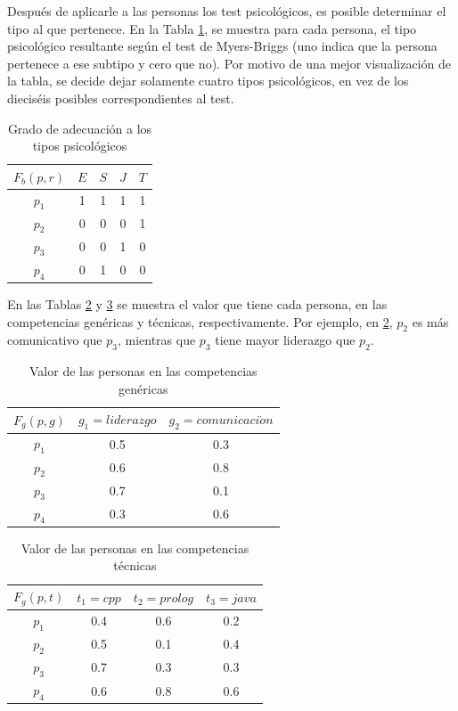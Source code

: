 Después de aplicarle a las personas los test psicológicos, es posible determinar el tipo al que pertenece. En la Tabla \ref{prps-sof}, se muestra para cada persona, el tipo psicológico resultante según el test de Myers-Briggs (uno indica que la persona pertenece a ese subtipo y cero que no). Por motivo de una mejor visualización de la tabla, se decide dejar solamente cuatro tipos psicológicos, en vez de los dieciséis posibles correspondientes al test.
\begin{table}[H]
  \centering
  \caption{Grado de adecuación a los tipos psicológicos}\label{prps-sof}
\begin{tabular}{|c|c|c|c|c|}
	\hline
	$F_b(p,r)$ & $E$ & $S$ & $J$ & $T$ \\ \hline
	  $p_1$    &  1  &  1  &  1  &  1  \\ \hline
	  $p_2$    &  0  &  0  &  0  &  1  \\ \hline
	  $p_3$    &  0  &  0  &  1  &  0  \\ \hline
	  $p_4$    &  0  &  1  &  0  &  0  \\ \hline
\end{tabular}
\end{table}


En las Tablas \ref{pcg-sof} y \ref{pct-sof} se muestra el valor que tiene cada persona, en las competencias genéricas y técnicas, respectivamente. Por ejemplo, en \ref{pcg-sof}, $p_2$ es más comunicativo que $p_3$, mientras que $p_3$ tiene mayor liderazgo que $p_2$.


\begin{table}[H]
	\centering
	\caption{Valor de las personas en las competencias genéricas}\label{pcg-sof}
	\begin{tabular}{|c|c|c|}
		\hline
		$F_g(p,g)$ & $g_1=liderazgo$ & $g_2=comunicaci\acute{o}n$ \\ \hline
		  $p_1$    &       0.5       &            0.3             \\ \hline
		  $p_2$    &       0.6       &            0.8             \\ \hline
		  $p_3$    &       0.7       &            0.1             \\ \hline
		  $p_4$    &       0.3       &            0.6             \\ \hline
	\end{tabular}
\end{table}

\begin{table}[H]
	\centering
	\caption{Valor de las personas en las competencias técnicas}\label{pct-sof}
	\begin{tabular}{|c|c|c|c|}
		\hline
		$F_g(p,t)$ & $t_1=cpp$ & $t_2=prolog$ & $t_3=java$ \\ \hline
		  $p_1$    &    0.4    &     0.6      &    0.2     \\ \hline
		  $p_2$    &    0.5    &     0.1      &    0.4     \\ \hline
		  $p_3$    &    0.7    &     0.3      &    0.3     \\ \hline
		  $p_4$    &    0.6    &     0.8      &    0.6     \\ \hline
	\end{tabular}
\end{table}

